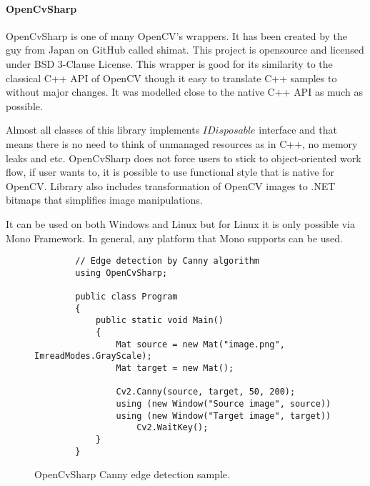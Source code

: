 \documentclass[../../../../main]{subfiles}
\begin{document}
\paragraph{OpenCvSharp}

OpenCvSharp is one of many {\Csharp} OpenCV's wrappers. It has been created by the guy from Japan on GitHub called shimat. This project is opensource and licensed under BSD 3-Clause License. This wrapper is good for its similarity to the classical C++ \ac{API} of \ac{OpenCV} though it easy to translate C++ samples to {\Csharp} without major changes. It was modelled close to the native C++ \ac{API} as much as possible.

Almost all classes of this library implements $IDisposable$ interface and that means there is no need to think of unmanaged resources as in C++, no memory leaks and etc. OpenCvSharp does not force users to stick to object-oriented work flow, if user wants to, it is possible to use functional style that is native for \ac{OpenCV}. Library also includes transformation of \ac{OpenCV} images to .NET bitmaps that simplifies image manipulations.

It can be used on both Windows and Linux but for Linux it is only possible via Mono Framework. In general, any platform that Mono supports can be used.

\begin{figure} [!ht]
  \centering    
    \lstset{style=sharpc}
        \begin{lstlisting}
        // Edge detection by Canny algorithm
        using OpenCvSharp;
        
        public class Program 
        {
            public static void Main() 
            {
                Mat source = new Mat("image.png", ImreadModes.GrayScale);
                Mat target = new Mat();
                
                Cv2.Canny(source, target, 50, 200);
                using (new Window("Source image", source)) 
                using (new Window("Target image", target)) 
                    Cv2.WaitKey();
            }
        }
        \end{lstlisting}
  \caption{OpenCvSharp Canny edge detection sample.}
  \label{opencvsharpcanny}
\end{figure}
\end{document}
